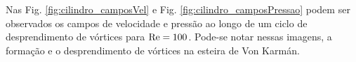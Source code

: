 \documentclass[tese_patricia]{subfiles}%
\begin{document}
Nas Fig. \ref{fig:cilindro_camposVel} e Fig. \ref{fig:cilindro_camposPressao} podem ser observados os campos de velocidade e pressão ao longo de um ciclo de desprendimento de vórtices para $\mathrm{Re} = 100$. Pode-se notar nessas imagens, a formação e o desprendimento de vórtices na esteira de Von Karmán.

\begin{figure}[htb!]
	\centering
	 \
	 \\

\end{figure}
\end{document}
